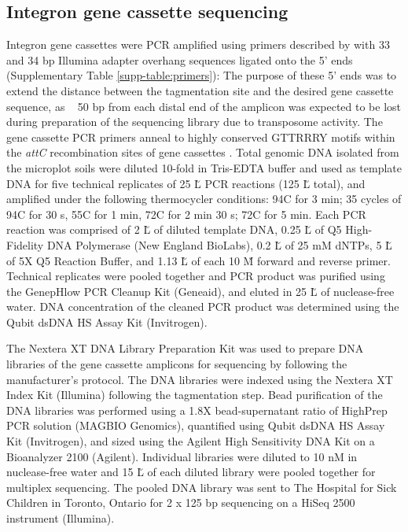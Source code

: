 \subsection{Integron gene cassette sequencing}

Integron gene cassettes were PCR amplified using primers described by \cite{Stokes.2001} with 33 and 34 bp Illumina adapter overhang sequences ligated onto the 5’ ends (Supplementary Table \ref{supp-table:primers}):
The purpose of these 5’ ends was to extend the distance between the tagmentation site and the desired gene cassette sequence, as ~ 50 bp from each distal end of the amplicon was expected to be lost during preparation of the sequencing library due to transposome activity.
The gene cassette PCR primers anneal to highly conserved GTTRRRY motifs within the \textit{attC} recombination sites of gene cassettes \dummyfig.
Total genomic DNA isolated from the microplot soils were diluted 10-fold in Tris-EDTA buffer and used as template DNA for five technical replicates of 25 \u L PCR reactions (125 \u L total), and amplified under the following thermocycler conditions:
94\degree C for 3 min; 35 cycles of 94\degree C for 30 s, 55\degree C for 1 min, 72\degree C for 2 min 30 s; 72\degree C for 5 min.
Each PCR reaction was comprised of 2 \u L of diluted template DNA, 0.25 \u L of Q5\textsuperscript{\textregistered{}} High-Fidelity DNA Polymerase (New England BioLabs), 0.2 \u L of 25 mM dNTPs, 5 \u L of 5X Q5\textsuperscript{\textregistered{}} Reaction Buffer, and 1.13 \u L of each 10 \u M forward and reverse primer.
Technical replicates were pooled together and PCR product was purified using the GenepHlow PCR Cleanup Kit (Geneaid), and eluted in 25 \u L of nuclease-free water.
DNA concentration of the cleaned PCR product was determined using the Qubit\textsuperscript{\texttrademark{}} dsDNA HS Assay Kit (Invitrogen).


The Nextera\textsuperscript{\textregistered{}} XT DNA Library Preparation Kit was used to prepare DNA libraries of the gene cassette amplicons for sequencing by following the manufacturer’s protocol.
The DNA libraries were indexed using the Nextera\textsuperscript{\textregistered{}} XT Index Kit (Illumina) following the tagmentation step.
Bead purification of the DNA libraries was performed using a 1.8X bead-supernatant ratio of HighPrep\textsuperscript{\texttrademark{}} PCR solution (MAGBIO Genomics), quantified using Qubit\textsuperscript{\texttrademark{}} dsDNA HS Assay Kit (Invitrogen), and sized using the Agilent High Sensitivity DNA Kit on a Bioanalyzer 2100 (Agilent).
Individual libraries were diluted to 10 nM in nuclease-free water and 15 \u L of each diluted library were pooled together for multiplex sequencing.
The pooled DNA library was sent to The Hospital for Sick Children in Toronto, Ontario for 2 x 125 bp sequencing on a HiSeq 2500 instrument (Illumina).


